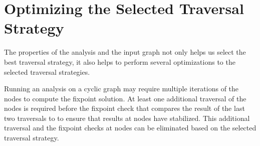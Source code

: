 \section{Optimizing the Selected Traversal Strategy}
\label{subsec:optimizations}
The properties of the analysis and the input graph not only helps us select the
best traversal strategy, it also helps to perform several optimizations to the
selected traversal strategies. 

Running an analysis on a cyclic graph may require multiple iterations of the
nodes to compute the fixpoint solution. At least one additional traversal of the
nodes is required before the fixpoint check that compares the result of the last
two traversals to to ensure that results at nodes have stabilized. This
additional traversal and the fixpoint checks at nodes can be eliminated based on
the selected traversal strategy.

